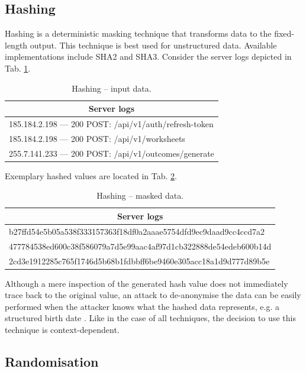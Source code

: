 \documentclass[a4paper,twoside,12pt]{book}
\begin{document}
\subsection{Hashing}

Hashing is a deterministic masking technique \cite{bib:anonymization_for_research} that transforms data to the fixed-length output. This technique is best used for unstructured data. Available implementations include SHA2 and SHA3.
%
Consider the server logs depicted in Tab. \ref{id:tab:hashing_raw}.
%
\begin{table}%
\centering
\caption{Hashing – input data.}
\label{id:tab:hashing_raw}
\begin{tabular}{l}
\toprule
\multicolumn{1}{c}{Server logs} \\ \midrule
185.184.2.198 — 200 POST: /api/v1/auth/refresh-token    \\
185.184.2.198 — 200 POST: /api/v1/worksheets \\
255.7.141.233 — 200 POST: /api/v1/outcomes/generate \\ \bottomrule
\end{tabular}
\end{table}
%
Exemplary hashed values are located in Tab. \ref{id:tab:hashing_masked}.
%
\begin{table}%
\centering
\caption{Hashing – masked data.}
\label{id:tab:hashing_masked}
\begin{tabular}{l}
\toprule
\multicolumn{1}{c}{Server logs} \\ \midrule
b27ffd54e5b05a538f333157363f18df0a2aaae5754dfd9ec9daad9cc4ccd7a2 \\
477784538ed600c38f586079a7d5e99aac4af97d1cb322888de54edeb600b14d \\
2cd3e1912285c765f1746d5b68b1fdbbff6be9460e305acc18a1d9d777d89b5e \\ \bottomrule
\end{tabular}
\end{table}
%
Although a mere inspection of the generated hash value does not immediately trace back to the original value, an attack to de-anonymise the data can be easily performed when the attacker knows what the hashed data represents, e.g. a structured birth date \cite{bib:hash}. Like in the case of all techniques, the decision to use this technique is context-dependent.

\subsection{Randomisation}
\end{document}

